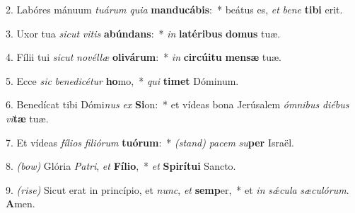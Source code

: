 2. Labóres mánuum \textit{tuárum} \textit{quia} \textbf{manducábis}:~* beátus es, \textit{et} \textit{be}\textit{ne} \textbf{tibi} erit.

3. Uxor tua \textit{sicut} \textit{vitis} \textbf{abúndans}:~* \textit{in} \textbf{latéribus} \textbf{domus} tuæ.

4. Fílii tui \textit{sicut} \textit{novéllæ} \textbf{olivárum}:~* \textit{in} \textbf{circúitu} \textbf{mensæ} tuæ.

5. Ecce \textit{sic} \textit{benedicétur} \textbf{ho}mo,~* \textit{qui} \textbf{timet} Dóminum.

6. Benedícat tibi Dómi\textit{nus} \textit{ex} \textbf{Si}on:~* et vídeas bona Jerúsalem \textit{ómnibus} \textit{diébus} \textit{vi}\textbf{tæ} tuæ.

7. Et vídeas \textit{fílios} \textit{filiórum} \textbf{tuórum}:~* {\color{red}\textit{(stand)}} \textit{pa}\textit{cem} \textit{su}\textbf{per} Israël.

8. {\color{red}\textit{(bow)}} Glória \textit{Patri}, \textit{et} \textbf{Fílio},~* \textit{et} \textbf{Spirítu}\textbf{i} Sancto.

9. {\color{red}\textit{(rise)}} Sicut erat in princípio, et \textit{nunc}, \textit{et} \textbf{semp}er,~* et \textit{in} \textit{sǽcula} \textit{sæculórum}. \textbf{A}men.